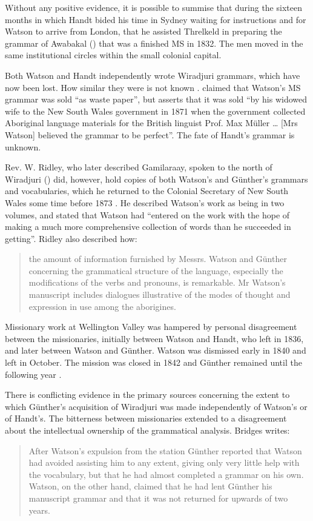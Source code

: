 Without any positive evidence, it is possible to summise that during the sixteen months in which Handt bided his time in Sydney waiting for instructions and for Watson to arrive from London, that he assisted Threlkeld in preparing the grammar of Awabakal (\citeyear{threlkeld_australian_1834}) that was a finished MS in 1832. The men moved in the same institutional circles within the small colonial capital. 

Both Watson and Handt independently wrote Wiradjuri grammars, which have now been lost. How similar they were is not known \citep[414--415]{bridges_church_1978}. \citet[xii]{fraser_australian_1892} claimed that Watson’s MS grammar was sold “as waste paper”, but \citet[799]{bridges_church_1978} asserts that it was sold “by his widowed wife to the New South Wales government in 1871 when the government collected Aboriginal language materials for the British linguist Prof. Max Müller … [Mrs Watson] believed the grammar to be perfect”. The fate of Handt’s grammar is unknown. 

Rev. W. Ridley, who later described Gamilaraay, spoken to the north of Wiradjuri () did, however, hold copies of both Watson’s and Günther’s grammars and vocabularies, which he returned to the Colonial Secretary of New South Wales some time before 1873 \citep[275--276]{ridley_report_1873}. He described Watson’s work as being in two volumes, and stated that Watson had “entered on the work with the hope of making a much more comprehensive collection of words than he succeeded in getting”. Ridley also described how:
\begin{quote}
    the amount of information furnished by Messrs. Watson and Günther concerning the grammatical structure of the language, especially the modifications of the verbs and pronouns, is remarkable. Mr Watson’s manuscript includes dialogues illustrative of the modes of thought and expression in use among the aborigines. \citep[276]{ridley_report_1873}
\end{quote}

Missionary work at Wellington Valley was hampered by personal disagreement between the missionaries, initially between Watson and Handt, who left in 1836, and later between Watson and Günther. Watson was dismissed early in 1840 and left in October. The mission was closed in 1842 and Günther remained until the following year \citep[7--8]{allen_2011}. 

There is conflicting evidence in the primary sources concerning the extent to which Günther’s acquisition of Wiradjuri was made independently of Watson’s \citep[483--490]{bridges_church_1978} or of Handt’s. The bitterness between missionaries extended to a disagreement about the intellectual ownership of the grammatical analysis. Bridges writes: 
\begin{quote}
    After Watson’s expulsion from the station Günther reported that Watson had avoided assisting him to any extent, giving only very little help with the vocabulary, but that he had almost completed a grammar on his own. Watson, on the other hand, claimed that he had lent Günther his manuscript grammar and that it was not returned for upwards of two years. \citep[485]{bridges_church_1978}
\end{quote}

